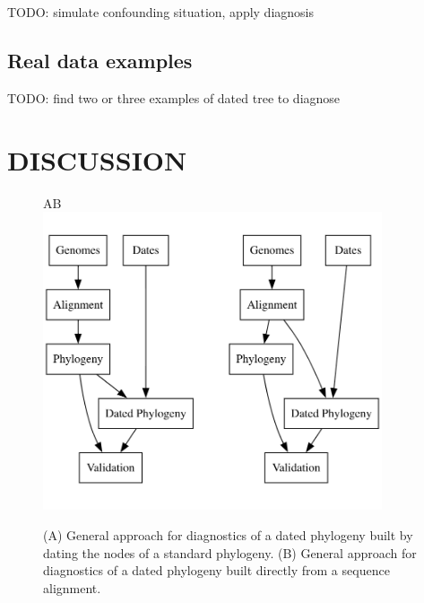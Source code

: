 \documentclass{article}
\begin{document}
TODO: simulate confounding situation, apply diagnosis

\subsection*{Real data examples}

TODO: find two or three examples of dated tree to diagnose

\section*{DISCUSSION}

\begin{figure}[p!]
\begin{center}
A\hspace*{6cm}B\hspace*{6cm}~\\
\includegraphics[width=10cm]{fig1.png}
\end{center}
\caption{(A) General approach for diagnostics of a dated phylogeny built by dating the nodes of a standard phylogeny. (B) General approach for diagnostics of a dated phylogeny built directly from a sequence alignment.
\label{fig:approach}}
\end{figure}
\end{document}
